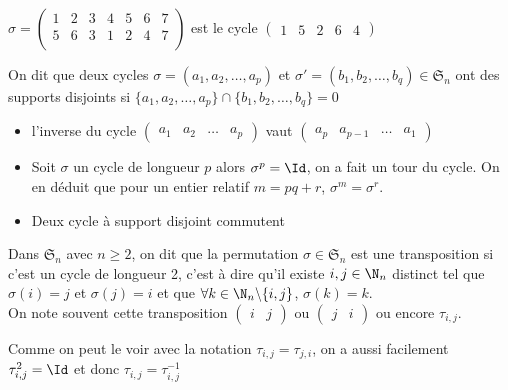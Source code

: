 \begin{ex}
$\sigma=\begin{pmatrix}
1 &2 &3 &4 &5 &6 &7\\
5 &6 & 3 & 1 & 2& 4 & 7\\
\end{pmatrix}$ est le cycle $\begin{pmatrix}
1&5&2&6&4
\end{pmatrix}$
\end{ex}
\begin{defini}
    On dit que deux cycles $\sigma=(a_1,a_2,\dots,a_p)$ et $\sigma'=(b_1,b_2,\dots,b_q)\in\mathfrak{S}_n$ ont des supports disjoints si
    $\{a_1,a_2,\dots,a_p\}\cap\{b_1,b_2,\dots,b_q\}=0$
\end{defini}
\begin{prop}
\begin{itemize}
\item l'inverse du cycle $\begin{pmatrix}
    a_1&a_2&\dots &a_p
\end{pmatrix}$ vaut $\begin{pmatrix}
a_p&a_{p-1}&\dots &a_1
\end{pmatrix}$
\item Soit $\sigma$ un cycle de longueur $p$ alors $\sigma^p=\Id$, on a fait un tour du cycle.
On en déduit que pour un entier relatif $m=pq+r$, $\sigma^m=\sigma^r$.
\item Deux cycle à support disjoint commutent
\end{itemize}
\end{prop}
\begin{defini}[Transposition]
Dans $\mathfrak{S}_n$ avec $n\geq 2$, on dit que la permutation $\sigma\in\mathfrak{S}_n$ est une transposition si c'est un cycle de longueur 2, c'est à dire qu'il existe $i,j\in\N_n$ distinct tel que $\sigma(i)=j$ et $\sigma(j)=i$ et que $\forall k\in\N_n\backslash\{i,j\}$, $\sigma(k)=k$.\\
On note souvent cette transposition $\begin{pmatrix}
i & j
\end{pmatrix}$ ou $\begin{pmatrix}
j & i
\end{pmatrix}$ ou encore $\tau_{i,j}$.
\end{defini}
\begin{prop}
Comme on peut le voir avec la notation $\tau_{i,j}=\tau_{j,i}$, on a aussi facilement $\tau^2_{i,j}=\Id$ et donc $\tau_{i,j}=\tau^{-1}_{i,j}$
\end{prop}

